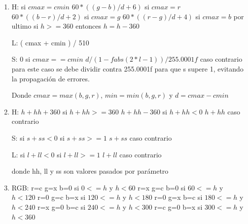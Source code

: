 \documentclass[a4paper]{article}
\begin{document}
\begin{enumerate}
	\item 
		H:  si $cmax = cmin$\newline
		$60 * ( (g-b)/d + 6 )$ si $cmax = r$\newline
		$60 * ( (b-r)/d + 2 )$ si $cmax = g$\newline
		$60 * ( (r-g)/d + 4 )$ si $cmax = b$\newline
		por ultimo si $h >= 360$ entonces $h = h - 360$\newline

		L: ( cmax + cmin ) / 510\newline

		S:\newline
		$0$ si $cmax == cmin$\newline
		$d / ( 1 - fabs( 2*l - 1 ) ) / 255.0001f$ caso contrario\newline
	  para este caso se debe dividir contra 255.0001f para que s supere 1, evitando la propagación de errores.\newline

		Donde $cmax = max(b,g,r)$, $min = min(b,g,r)$ y $d = cmax - cmin$\newline
	
	\item 
		H:\newline
		$h + hh + 360$ si $h+hh >= 360$\newline
		$h + hh - 360$ si $h+hh < 0$\newline
		$h + hh$ caso contrario\newline

		S: si $s+ss < 0$ si $s+ss >= 1$\newline
		$s + ss$ caso contrario\newline

		L: si $l+ll < 0$ si $l+ll >= 1 $\newline
		$l+ll$ caso contrario\newline

		donde hh, ll y ss son valores pasados por parámetro
		\newpage

	\item
		RGB:\newline
			r=c g=x b=0 si $0<=h$ y $h<60$\newline
			r=x g=c b=0 si $60<=h$ y $h<120$\newline
			r=0 g=c b=x si $120<=h$ y $h<180$\newline
			r=0 g=x b=c si $180<=h$ y $h<240$\newline
			r=x g=0 b=c si $240<=h$ y $h<300$\newline
			r=c g=0 b=x si $300<=h$ y $h<360$\newline


\end{enumerate}
\end{document}

